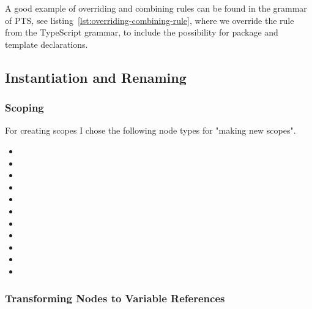 A good example of overriding and combining rules can be found in the grammar of PTS, see listing~\vref{lst:overriding-combining-rule}, where we override the  rule from the TypeScript grammar, to include the possibility for package and template declarations.



\subsection{Instantiation and Renaming}\label{subsec:instantiation-and-renaming}

\subsubsection{Scoping}\label{subsubsec:inst-scoping}

For creating scopes I chose the following node types for "making new scopes".

\begin{itemize}
    \item {}
    \item {}
    \item {}
    \item {}
    \item {}
    \item {}
    \item {}
    \item {}
    \item {}
    \item {}
    \item {}
\end{itemize}

\subsubsection{Transforming Nodes to Variable References}\label{subsubsec:transforming-nodes-to-variable-references}

